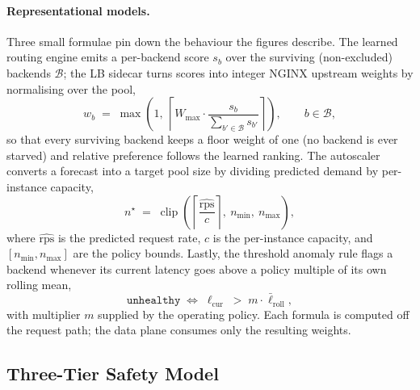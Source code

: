 \paragraph{Representational models.} Three small formulae pin down the behaviour
the figures describe. The learned routing engine emits a per-backend score $s_b$
over the surviving (non-excluded) backends $\mathcal{B}$; the LB sidecar turns
scores into integer NGINX upstream weights by normalising over the pool,
\begin{equation}
  w_b \;=\; \max\!\left(1,\ \left\lceil W_{\max}\cdot
  \frac{s_b}{\sum_{b'\in\mathcal{B}} s_{b'}}\right\rceil\right),
  \qquad b\in\mathcal{B},
  \label{dsb:eq:weights}
\end{equation}
so that every surviving backend keeps a floor weight of one (no backend is ever
starved) and relative preference follows the learned ranking. The autoscaler
converts a forecast into a target pool size by dividing predicted demand by
per-instance capacity,
\begin{equation}
  n^{\star} \;=\; \operatorname{clip}\!\left(
  \left\lceil \frac{\widehat{\mathrm{rps}}}{c}\right\rceil,\ n_{\min},\ n_{\max}\right),
  \label{dsb:eq:scale}
\end{equation}
where $\widehat{\mathrm{rps}}$ is the predicted request rate, $c$ is the
per-instance capacity, and $[n_{\min},n_{\max}]$ are the policy bounds. Lastly,
the threshold anomaly rule flags a backend whenever its current latency goes
above a policy multiple of its own rolling mean,
\begin{equation}
  \texttt{unhealthy} \;\Longleftrightarrow\;
  \ell_{\text{cur}} \;>\; m\cdot \bar{\ell}_{\text{roll}},
  \label{dsb:eq:anomaly}
\end{equation}
with multiplier $m$ supplied by the operating policy. Each formula is computed
off the request path; the data plane consumes only the resulting weights.

\subsection{Three-Tier Safety Model}
\label{dsb:sec-safety}

